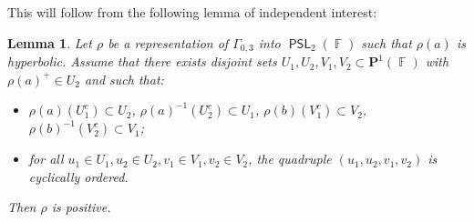 \documentclass{amsart}
\theoremstyle{plain}
\newtheorem{lemma}[proposition]{Lemma}
\theoremstyle{definition}
\DeclareMathOperator{\PSL}{\mathsf{PSL}}
\DeclareMathOperator{\Fb}{{\mathbb{F}}}
\newcommand{\1}{\mathbf{1}}
\begin{document}
This will follow from the following lemma of independent interest:

\begin{lemma}
\label{lem: SchottkyPositive}
    Let $\rho$ be a representation of $\Gamma_{0,3}$ into $\PSL_2(\Fb)$ such that $\rho(a)$ is hyperbolic. Assume that there exists disjoint sets $U_1, U_2, V_1, V_2 \subset \mathbf{P}^1(\Fb)$ with $\rho(a)^+ \in U_2$ and such that:
\begin{itemize}
    \item $\rho(a)(U_1^c)\subset U_2$, $\rho(a)^{-1}(U_2^c) \subset U_1$, $\rho(b)(V_1^c)\subset V_2$, $\rho(b)^{-1}(V_2^c)\subset V_1$;
    \item for all $u_1\in U_1, u_2 \in U_2, v_1\in V_1, v_2 \in V_2$, the quadruple $(u_1,u_2,v_1,v_2)$ is cyclically ordered.
\end{itemize}
Then $\rho$ is positive.
\end{lemma}
\end{document}
